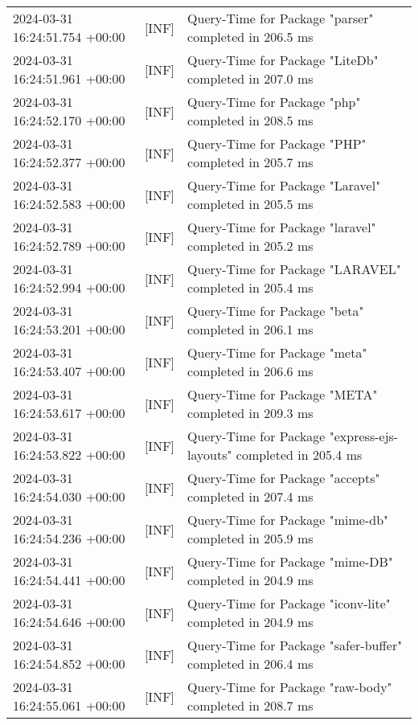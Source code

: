 \documentclass[10pt,a4paper,twoside]{article}
\begin{document}
\begin{appendices}
{{\begin{tabularx}{\textwidth}{|l|l|X|}
                    2024-03-31 16:24:51.754 +00:00 & [INF] & Query-Time for Package "parser" completed in 206.5 ms \\
                    2024-03-31 16:24:51.961 +00:00 & [INF] & Query-Time for Package "LiteDb" completed in 207.0 ms \\
                    2024-03-31 16:24:52.170 +00:00 & [INF] & Query-Time for Package "php" completed in 208.5 ms \\
                    2024-03-31 16:24:52.377 +00:00 & [INF] & Query-Time for Package "PHP" completed in 205.7 ms \\
                    2024-03-31 16:24:52.583 +00:00 & [INF] & Query-Time for Package "Laravel" completed in 205.5 ms \\
                    2024-03-31 16:24:52.789 +00:00 & [INF] & Query-Time for Package "laravel" completed in 205.2 ms \\
                    2024-03-31 16:24:52.994 +00:00 & [INF] & Query-Time for Package "LARAVEL" completed in 205.4 ms \\
                    2024-03-31 16:24:53.201 +00:00 & [INF] & Query-Time for Package "beta" completed in 206.1 ms \\
                    2024-03-31 16:24:53.407 +00:00 & [INF] & Query-Time for Package "meta" completed in 206.6 ms \\
                    2024-03-31 16:24:53.617 +00:00 & [INF] & Query-Time for Package "META" completed in 209.3 ms \\
                    2024-03-31 16:24:53.822 +00:00 & [INF] & Query-Time for Package "express-ejs-layouts" completed in 205.4 ms \\
                    2024-03-31 16:24:54.030 +00:00 & [INF] & Query-Time for Package "accepts" completed in 207.4 ms \\
                    2024-03-31 16:24:54.236 +00:00 & [INF] & Query-Time for Package "mime-db" completed in 205.9 ms \\
                    2024-03-31 16:24:54.441 +00:00 & [INF] & Query-Time for Package "mime-DB" completed in 204.9 ms \\
                    2024-03-31 16:24:54.646 +00:00 & [INF] & Query-Time for Package "iconv-lite" completed in 204.9 ms \\
                    2024-03-31 16:24:54.852 +00:00 & [INF] & Query-Time for Package "safer-buffer" completed in 206.4 ms \\
                    2024-03-31 16:24:55.061 +00:00 & [INF] & Query-Time for Package "raw-body" completed in 208.7 ms \\

\end{tabularx}}}
\end{appendices}
\end{document}
